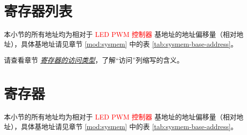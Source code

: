 \documentclass[main\_\_CN.tex]{subfiles}
\begin{document}

\clearpage
\hypertarget{ledpwm-reg-summ}{}
\section{寄存器列表}
\label{sec:ledpwm-reg-summ}

本小节的所有地址均为相对于 \textcolor{red}{LED PWM 控制器} 基地址的地址偏移量（相对地址），具体基地址请见章节 \ref{mod:sysmem} \textit{} 中的表 \ref{tab:sysmem-base-address}。

请查看章节 \hyperref[glossary-access-types]{\textit{寄存器的访问类型}}，了解“访问”列缩写的含义。






\clearpage
\section{寄存器}

本小节的所有地址均为相对于 \textcolor{red}{LED PWM 控制器} 基地址的地址偏移量（相对地址），具体基地址请见章节 \ref{mod:sysmem} \textit{} 中的表 \ref{tab:sysmem-base-address}。


\end{document}
